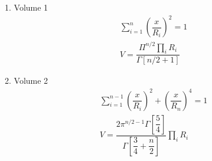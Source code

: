 \documentclass[11pt,letterpaper]{article}
\begin{document}
1. Volume  1 
\begin{gather}
\sum_{i=1}^{n} \left(\dfrac{x}{R_i} \right)^2 = 1\\
V = \dfrac{\Pi^{n/2} \prod_i R_i }{\Gamma[n/2 +1]} 
\end{gather}

2. Volume 2
\begin{gather}
\sum_{i=1}^{n-1} \left(\dfrac{x}{R_i} \right)^2 + \left(\dfrac{x}{R_n}\right)^4 = 1 \\
V = \dfrac{2 \pi ^{n/2-1} \Gamma[\dfrac{5}{4}] }{\Gamma \left[\dfrac{3}{4} + \dfrac{n}{2}\right]}\prod_i R_i 
\end{gather}
\end{document}
